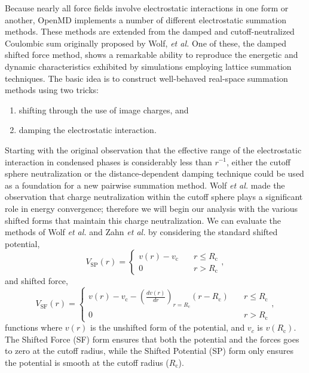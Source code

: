 \documentclass[letterpaper]{report}
\begin{document}
Because nearly all force fields involve electrostatic interactions in
one form or another, OpenMD implements a number of different
electrostatic summation methods.  These methods are extended from the
damped and cutoff-neutralized Coulombic sum originally proposed by
Wolf, {\it et al.}\cite{Wolf99} One of these, the damped shifted force
method, shows a remarkable ability to reproduce the energetic and
dynamic characteristics exhibited by simulations employing lattice
summation techniques.  The basic idea is to construct well-behaved
real-space summation methods using two tricks:
\begin{enumerate}
\item shifting through the use of image charges, and 
\item damping the electrostatic interaction.
\end{enumerate} 
Starting with the original observation that the effective range of the
electrostatic interaction in condensed phases is considerably less
than $r^{-1}$, either the cutoff sphere neutralization or the
distance-dependent damping technique could be used as a foundation for
a new pairwise summation method.  Wolf \textit{et al.} made the
observation that charge neutralization within the cutoff sphere plays
a significant role in energy convergence; therefore we will begin our
analysis with the various shifted forms that maintain this charge
neutralization.  We can evaluate the methods of Wolf
\textit{et al.}  and Zahn \textit{et al.} by considering the standard
shifted potential,
\begin{equation}
V_\textrm{SP}(r) =      \begin{cases}
v(r)-v_\textrm{c} &\quad r\leqslant R_\textrm{c} \\ 0 &\quad r >
R_\textrm{c}  
\end{cases},
\label{eq:shiftingPotForm}
\end{equation}
and shifted force,
\begin{equation}
V_\textrm{SF}(r) =      \begin{cases}
v(r)-v_\textrm{c}-\left(\frac{d v(r)}{d r}\right)_{r=R_\textrm{c}}(r-R_\textrm{c
})
&\quad r\leqslant R_\textrm{c} \\ 0 &\quad r > R_\textrm{c} 
                                                \end{cases},
\label{eq:shiftingForm}
\end{equation}
functions where $v(r)$ is the unshifted form of the potential, and
$v_c$ is $v(R_\textrm{c})$.  The Shifted Force (SF) form ensures
that both the potential and the forces goes to zero at the cutoff
radius, while the Shifted Potential (SP) form only ensures the
potential is smooth at the cutoff radius
($R_\textrm{c}$).\cite{Allen87}
\end{document}
